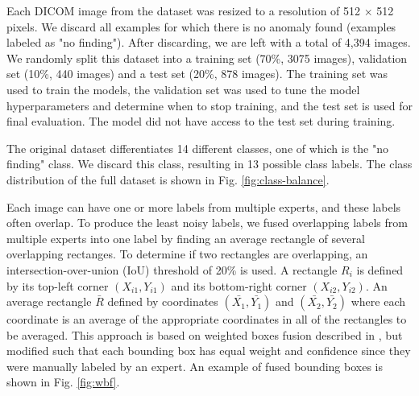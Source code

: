 \documentclass[conference]{IEEEtran}
\begin{document}
Each DICOM image from the dataset was resized to a resolution of 512 $\times$ 512 pixels. We 
discard all examples for which there is no anomaly found (examples labeled as "no finding"). After 
discarding, we are left with a total of 4,394 images. We randomly split this dataset into a 
training set (70\%, 3075 images), validation set (10\%, 440 images) and a test set (20\%, 878 
images). The training set was used to train the models, the validation set was used to tune the 
model hyperparameters and determine when to stop training, and the test set is used for final 
evaluation. The model did not have access to the test set during training.

The original dataset differentiates 14 different classes, one of which is the "no finding" class. 
We discard this class, resulting in 13 possible class labels. The class distribution of the full 
dataset is shown in Fig. \ref{fig:class-balance}.

Each image can have one or more 
labels from multiple experts, and these labels often overlap. To produce the least noisy labels, 
we fused overlapping labels from multiple experts into one label by finding an average rectangle 
of several overlapping rectanges. To determine if two rectangles are overlapping, an intersection-over-union 
(IoU) threshold of 20\% is used. A rectangle ${R_i}$ is defined by its top-left corner 
$(X_{i1}, Y_{i1})$ and its bottom-right corner $(X_{i2}, Y_{i2})$. An average rectangle $\bar{R}$ 
defined by coordinates $(\bar{X_{1}}, \bar{Y_{1}})$ and $(\bar{X_{2}}, \bar{Y_{2}})$ where each 
coordinate is an average of the appropriate coordinates in all of the rectangles to be averaged.
This approach is based on weighted boxes fusion 
described in \cite{solovyevWeightedBoxesFusion2021}, but modified such that each bounding box has 
equal weight and confidence since they were manually labeled by an expert. An example of fused 
bounding boxes is shown in Fig. \ref{fig:wbf}.
\end{document}
